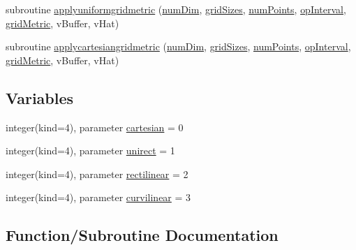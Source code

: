 \begin{DoxyCompactItemize}
\item 
subroutine \hyperlink{namespacegrid_a43b9c1dd56d93e4e53c25044ce190ef9}{applyuniformgridmetric} (\hyperlink{SATKernels_8H_a680185db8546de161968dabace9e94f1}{num\+Dim}, \hyperlink{ViscidKernels_8H_a969a5d6106eec8b7096250b27865b9ba}{grid\+Sizes}, \hyperlink{ViscidKernels_8H_adf0bf75d0875d1bb42a5348bee7b7bfd}{num\+Points}, \hyperlink{WENOKernels_8H_a23d86f4608a92738225f87574392b273}{op\+Interval}, \hyperlink{WENOKernels_8H_a901f07fa4e3f966a2f6951d6c5974e89}{grid\+Metric}, v\+Buffer, v\+Hat)
\item 
subroutine \hyperlink{namespacegrid_a532fa7a70556e4067221c4174bab01d1}{applycartesiangridmetric} (\hyperlink{SATKernels_8H_a680185db8546de161968dabace9e94f1}{num\+Dim}, \hyperlink{ViscidKernels_8H_a969a5d6106eec8b7096250b27865b9ba}{grid\+Sizes}, \hyperlink{ViscidKernels_8H_adf0bf75d0875d1bb42a5348bee7b7bfd}{num\+Points}, \hyperlink{WENOKernels_8H_a23d86f4608a92738225f87574392b273}{op\+Interval}, \hyperlink{WENOKernels_8H_a901f07fa4e3f966a2f6951d6c5974e89}{grid\+Metric}, v\+Buffer, v\+Hat)
\end{DoxyCompactItemize}
\subsection*{Variables}
\begin{DoxyCompactItemize}
\item 
integer(kind=4), parameter \hyperlink{namespacegrid_a93002a1fdf205e858b27917e5ef07e87}{cartesian} = 0
\item 
integer(kind=4), parameter \hyperlink{namespacegrid_ae5c8d9b8d49f1a584ddc38e794825323}{unirect} = 1
\item 
integer(kind=4), parameter \hyperlink{namespacegrid_a56b6da89996d538d28fc889ff68ce087}{rectilinear} = 2
\item 
integer(kind=4), parameter \hyperlink{namespacegrid_a5e3aa0692b948da96fa11d90eb6c17ff}{curvilinear} = 3
\end{DoxyCompactItemize}


\subsection{Function/\+Subroutine Documentation}
\hypertarget{namespacegrid_a532fa7a70556e4067221c4174bab01d1}{}\label{namespacegrid_a532fa7a70556e4067221c4174bab01d1} 
